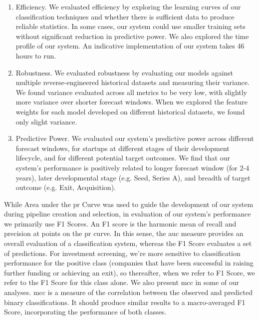\documentclass[../thesis/thesis.tex]{subfiles}
\begin{document}
\begin{enumerate}

\item Efficiency. We evaluated efficiency by exploring the learning curves of our classification techniques and whether there is sufficient data to produce reliable statistics. In some cases, our system could use smaller training sets without significant reduction in predictive power. We also explored the time profile of our system. An indicative implementation of our system takes 46 hours to run.

\item Robustness. We evaluated robustness by evaluating our models against multiple reverse-engineered historical datasets and measuring their variance. We found variance evaluated across all metrics to be very low, with slightly more variance over shorter forecast windows. When we explored the feature weights for each model developed on different historical datasets, we found only slight variance.

\item Predictive Power. We evaluated our system's predictive power across different forecast windows, for startups at different stages of their development lifecycle, and for different potential target outcomes. We find that our system's performance is positively related to longer forecast window (for 2-4 years), later developmental stage (e.g. Seed, Series A), and breadth of target outcome (e.g. Exit, Acquisition).

\end{enumerate}

While Area under the \gls{pr} Curve was used to guide the development of our system during pipeline creation and selection, in evaluation of our system's performance we primarily use F1 Scores. An F1 score is the harmonic mean of recall and precision at points on the \gls{pr} curve. In this sense, the \gls{auc} measure provides an overall evaluation of a classification system, whereas the F1 Score evaluates a set of predictions. For investment screening, we're more sensitive to classification performance for the positive class (companies that have been successful in raising further funding or achieving an exit), so thereafter, when we refer to F1 Score, we refer to the F1 Score for this class alone. We also present \gls{mcc} in some of our analyses. \Gls{mcc} is a measure of the correlation between the observed and predicted binary classifications. It should produce similar results to a macro-averaged F1 Score, incorporating the performance of both classes.
\end{document}
